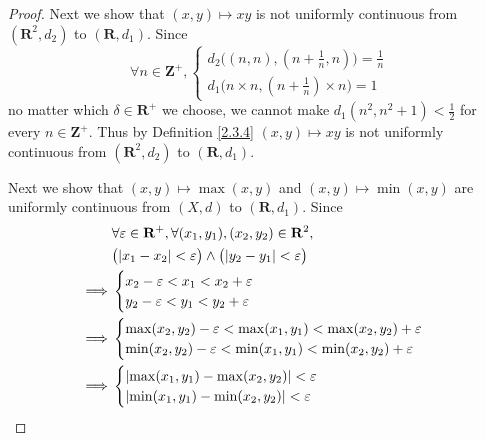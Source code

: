 \begin{proof}
    Next we show that \((x, y) \mapsto xy\) is not uniformly continuous from \((\mathbf{R}^2, d_2)\) to \((\mathbf{R}, d_1)\).
    Since
    \[
        \forall n \in \mathbf{Z}^+, \begin{cases}
            d_2\big((n, n), (n + \frac{1}{n}, n)\big) = \frac{1}{n} \\
            d_1\big(n \times n, (n + \frac{1}{n}) \times n\big) = 1
        \end{cases}
    \]
    no matter which \(\delta \in \mathbf{R}^+\) we choose, we cannot make \(d_1(n^2, n^2 + 1) < \frac{1}{2}\) for every \(n \in \mathbf{Z}^+\).
    Thus by Definition \ref{2.3.4} \((x, y) \mapsto xy\) is not uniformly continuous from \((\mathbf{R}^2, d_2)\) to \((\mathbf{R}, d_1)\).

    Next we show that \((x, y) \mapsto \max(x, y)\) and \((x, y) \mapsto \min(x, y)\) are uniformly continuous from \((X, d)\) to \((\mathbf{R}, d_1)\).
    Since
    \begin{align*}
                 & \forall \varepsilon \in \mathbf{R}^+, \forall (x_1, y_1), (x_2, y_2) \in \mathbf{R}^2,  \\
                 & \big(\abs*{x_1 - x_2} < \varepsilon\big) \land \big(\abs*{y_2 - y_1} < \varepsilon\big) \\
        \implies & \begin{cases}
                       x_2 - \varepsilon < x_1 < x_2 + \varepsilon \\
                       y_2 - \varepsilon < y_1 < y_2 + \varepsilon \\
                   \end{cases}                                             \\
        \implies & \begin{cases}
                       \max(x_2, y_2) - \varepsilon < \max(x_1, y_1) < \max(x_2, y_2) + \varepsilon \\
                       \min(x_2, y_2) - \varepsilon < \min(x_1, y_1) < \min(x_2, y_2) + \varepsilon
                   \end{cases}            \\
        \implies & \begin{cases}
                       \abs*{\max(x_1, y_1) - \max(x_2, y_2)} < \varepsilon \\
                       \abs*{\min(x_1, y_1) - \min(x_2, y_2)} < \varepsilon
                   \end{cases}
    \end{align*}

\end{proof}
